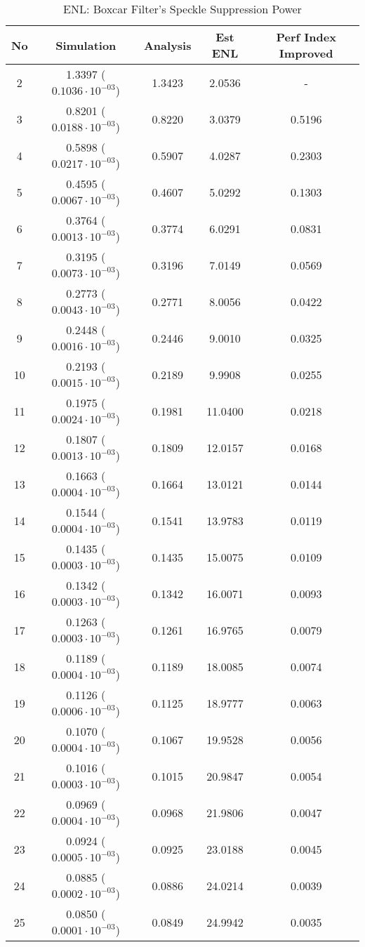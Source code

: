 \begin{table}
\centering

\begin{tabular}{c|c|c|c|c}
No  & Simulation                      &Analysis   &Est ENL       & Perf Index Improved \\%
\hline
2   &1.3397 ($0.1036 \cdot 10^{-03}$) &1.3423	 &2.0536	& - \\
3   &0.8201 ($0.0188 \cdot 10^{-03}$) &0.8220	 &3.0379	& 0.5196\\
4   &0.5898 ($0.0217 \cdot 10^{-03}$) &0.5907	 &4.0287	& 0.2303\\
5   &0.4595 ($0.0067 \cdot 10^{-03}$) &0.4607	 &5.0292	& 0.1303\\
6   &0.3764 ($0.0013 \cdot 10^{-03}$) &0.3774	 &6.0291	& 0.0831\\
7   &0.3195 ($0.0073 \cdot 10^{-03}$) &0.3196	 &7.0149	& 0.0569\\
8   &0.2773 ($0.0043 \cdot 10^{-03}$) &0.2771	 &8.0056	& 0.0422\\
9   &0.2448 ($0.0016 \cdot 10^{-03}$) &0.2446	 &9.0010	& 0.0325\\
10  &0.2193 ($0.0015 \cdot 10^{-03}$) &0.2189	 &9.9908	& 0.0255\\
11  &0.1975 ($0.0024 \cdot 10^{-03}$) &0.1981	 &11.0400	& 0.0218\\
12  &0.1807 ($0.0013 \cdot 10^{-03}$) &0.1809	 &12.0157	& 0.0168\\
13  &0.1663 ($0.0004 \cdot 10^{-03}$) &0.1664	 &13.0121	& 0.0144\\
14  &0.1544 ($0.0004 \cdot 10^{-03}$) &0.1541	 &13.9783	& 0.0119\\
15  &0.1435 ($0.0003 \cdot 10^{-03}$) &0.1435	 &15.0075	& 0.0109\\
16  &0.1342 ($0.0003 \cdot 10^{-03}$) &0.1342	 &16.0071	& 0.0093\\
17  &0.1263 ($0.0003 \cdot 10^{-03}$) &0.1261	 &16.9765	& 0.0079\\
18  &0.1189 ($0.0004 \cdot 10^{-03}$) &0.1189	 &18.0085	& 0.0074\\
19  &0.1126 ($0.0006 \cdot 10^{-03}$) &0.1125	 &18.9777	& 0.0063\\
20  &0.1070 ($0.0004 \cdot 10^{-03}$) &0.1067	 &19.9528	& 0.0056\\
21  &0.1016 ($0.0003 \cdot 10^{-03}$) &0.1015	 &20.9847	& 0.0054\\
22  &0.0969 ($0.0004 \cdot 10^{-03}$) &0.0968	 &21.9806	& 0.0047\\
23  &0.0924 ($0.0005 \cdot 10^{-03}$) &0.0925	 &23.0188	& 0.0045\\
24  &0.0885 ($0.0002 \cdot 10^{-03}$) &0.0886	 &24.0214	& 0.0039\\
25  &0.0850 ($0.0001 \cdot 10^{-03}$) &0.0849	 &24.9942	& 0.0035
\end{tabular}

\caption{ ENL: Boxcar Filter's Speckle Suppression Power }
\label{tab:enl_in_log_domain}
\end{table}

